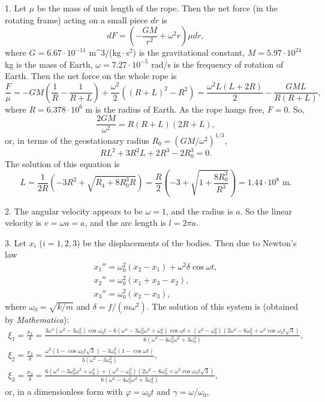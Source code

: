 \documentclass[12pt,a4paper,pdflatex]{disser}
\begin{document}
1. Let $\mu$ be the mass of unit length of the rope. Then the net force (in the rotating frame) acting on a small piece $dr$ is
$$
  dF=\left(-\frac{GM}{r^2}+\omega^2 r\right)\mu dr,
$$
where $G=6.67\cdot 10^{-11}$ m^3/(\textrm{kg}\,$\cdot$\,s$^2$) is the gravitational constant, $M=5.97\cdot 10^{24}$ kg is the mass of Earth, $\omega=7.27\cdot 10^{-5}$ rad/s is the frequency of rotation of Earth. Then the net force on the whole rope is
$$
  \frac{F}{\mu}=-GM\left(\frac1R-\frac1{R+L}\right)+\frac{\omega^2}{2}\left((R+L)^2-R^2\right)=\frac{\omega^2 L(L+2R)}{2}-\frac{GML}{R(R+L)},
$$
where $R=6.378\cdot 10^6$ m is the radius of Earth. As the rope hangs free, $F=0$. So,
$$
  \frac{2GM}{\omega^2}=R(R+L)(2R+L),
$$
or, in terms of the geostationary radius $R_0=(GM/\omega^2)^{1/3}$,
$$
  RL^2+3R^2 L+2R^3-2R_0^3=0.
$$
The solution of this equation is
$$
  L=\frac{1}{2R}\left(-3R^2+\sqrt{R_4+8R_0^3 R}\right)=\frac{R}{2}\left(-3+\sqrt{1+\frac{8R_0^3}{R^3}}\right)=1.44\cdot 10^8 \text{ m}.
$$

2. The angular velocity appears to be $\omega=1$, and the radius is $a$. So the linear velocity is $v=\omega a=a$, and the arc length is $l=2\pi a$.

3. Let $x_i$ ($i=1,2,3$) be the displacements of the bodies. Then due to Newton's law
\begin{gather*}
  x_1 ''=\omega_0^2 (x_2-x_1)+ \omega^2 \delta \cos\omega t,\\
  x_2 ''=\omega_0^2 (x_1+x_3-x_2),\\
  x_3 ''=\omega_0^2 (x_2-x_3),
\end{gather*}
where $\omega_0=\sqrt{k/m}$ and $\delta=f/\left(m \omega^2\right)$.
The solution of this system is (obtained by \textit{Mathematica}):
\begin{gather*}
  \xi_1=\frac{x_1}{\delta}=\frac{3\omega^2 \left(\omega^2-3\omega_0^2\right)\cos\omega_0 t -6\left(\omega^4-3\omega_0^2 \omega^2+\omega_0^4\right)\cos\omega t+\left(\omega^2-\omega_0^2\right)\left(2\omega^2-6\omega_0^2+\omega^2 \cos \omega_0 t\sqrt{3}\right)}{6\left(\omega^4-4\omega_0^2 \omega^2+3\omega_0^4\right)},\\
  \xi_2=\frac{x_2}{\delta}=\frac{\omega^2 \left(1-\cos\omega_0 t\sqrt{3}\right)-3\omega_0^2 \left(1-\cos\omega t\right)}{3\left(\omega^2-3\omega_0^2\right)},\\
  \xi_3=\frac{x_3}{\delta}=\frac{6\left(\omega^4-3\omega_0^2 \omega^2+\omega_0^4\right)+\left(\omega^2-\omega_0^2\right)\left(2\omega^2-6\omega_0^2+\omega^2 \cos \omega_0 t\sqrt{3}\right)}{6\left(\omega^4-4\omega_0^2 \omega^2+3\omega_0^4\right)},
\end{gather*}
or, in a dimensionless form with $\varphi=\omega_0 t$ and $\gamma=\omega/\omega_0$,
\end{document}

